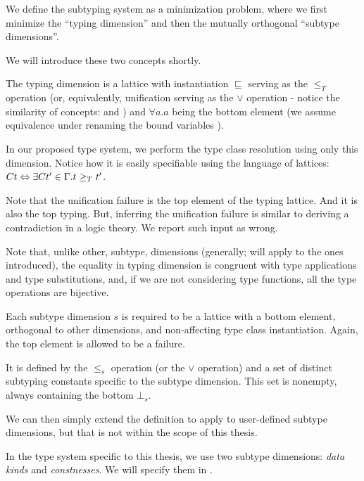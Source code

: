 \begin{defn}
    We define the subtyping system as a minimization problem, where we first minimize the ``typing dimension'' and then the mutually orthogonal ``subtype dimensions''.

    We will introduce these two concepts shortly.
\end{defn}


\begin{defn}
    \label{typing_def}
    The typing dimension is a lattice with instantiation $\sqsubseteq$ serving as the $\leq_T$ operation (or, equivalently, unification serving as the $\lor$ operation - notice the similarity of concepts:  and ) and $\forall a . a$ being the bottom element (we assume equivalence under renaming the bound variables ).

    In our proposed type system, we perform the type class resolution using only this dimension. Notice how it is easily specifiable using the language of lattices: $C t \Leftrightarrow \exists C t' \in \Gamma . t \geq_T t'$.
\end{defn}

\begin{remark}
    Note that the unification failure is the top element of the typing lattice. And it is also the top typing. But, inferring the unification failure is similar to deriving a contradiction in a logic theory. We report such input as wrong.
\end{remark}

\begin{remark}
    Note that, unlike other, subtype, dimensions (generally; will apply to the ones introduced), the equality in typing dimension is congruent with type applications and type substitutions, and, if we are not considering type functions, all the type operations are bijective.
\end{remark}

\begin{defn}
    Each subtype dimension $s$ is required to be a lattice with a bottom element, orthogonal to other dimensions, and non-affecting type class instantiation. Again, the top element is allowed to be a failure.

    It is defined by the $\leq_s$ operation (or the $\lor$ operation) and a set of distinct subtyping constants specific to the subtype dimension. This set is nonempty, always containing the bottom $\bot_s$.

    We can then simply extend the definition to apply to user-defined subtype dimensions, but that is not within the scope of this thesis.

    In the type system specific to this thesis, we use two subtype dimensions: \textit{data kinds} and \textit{constnesses}. We will specify them in .
\end{defn}


